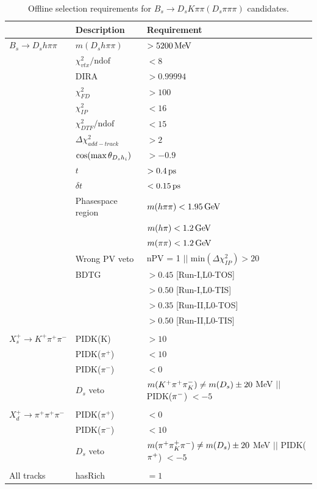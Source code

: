 \begin{table}[h]
\centering
\caption{Offline selection requirements for $B_s\to D_s K \pi\pi (D_s \pi\pi\pi)$ candidates.}
 \renewcommand{\arraystretch}{1.}
 \small
 \begin{tabular}{l l l}
\hline
\hline
 & Description & Requirement  \\
\hline
$B_s \to D_s h \pi \pi$  & $m(D_s h \pi \pi)$ & $> 5200 \mathrm{\,Me\kern -0.1em V}$ \\
&  $\chi^{2}_{vtx}/\text{ndof}  $&$ <  8$ \\
& DIRA &$ > 0.99994$ \\
& $\chi^{2}_{FD}$ & $> 100$ \\
& $\chi^{2}_{IP}$ & $< 16$ \\
&  $\chi^{2}_{DTF}/\text{ndof} $&$   <  15 $ \\
&  $\Delta\chi^{2}_{add-track} $&$   >  2 $ \\
& $\cos(\text{max} \, \theta_{{{D}_{s}} h_{i}})$ &$   > -0.9 $ \\
& $t$  & $ > 0.4 {\mathrm{ \,ps}}$ \\
& $\delta t$  & $ < 0.15 {\mathrm{ \,ps}}$ \\
& Phasespace region & $m(h\pi\pi) < 1.95 \mathrm{\,Ge\kern -0.1em V}$ \\ & & $m(h\pi) < 1.2 \mathrm{\,Ge\kern -0.1em V}$ \\ & & $m(\pi\pi) < 1.2 \mathrm{\,Ge\kern -0.1em V}$ \\
& Wrong PV veto & nPV = 1 $||$  $\text{min}(\Delta\chi^{2}_{IP}) > 20$ \\
& BDTG &  $> 0.45$ [Run-I,\textsf{L0-TOS}] \\
& & $> 0.50$ [Run-I,\textsf{L0-TIS}] \\
& & $> 0.35$ [Run-II,\textsf{L0-TOS}] \\
& & $> 0.50$ [Run-II,\textsf{L0-TIS}] \\
\\
$X_s^+ \to K^+ \pi^+ \pi^-$  & PIDK(K) & $> 10$ \\
& PIDK($\pi^+$) & $< 10$ \\
& PIDK($\pi^-$) & $< 0$ \\
& $D_s$ veto & $m({{K}^+} {{\pi}^+} \pi^-_K) \ne m(D_s) \pm 20$ MeV $||$ PIDK(${{\pi}^-}$) $< -5$ \\
\\
$X_d^+ \to \pi^+ \pi^+ \pi^-$  & PIDK($\pi^+$) & $< 0$ \\
& PIDK($\pi^-$) & $< 10$ \\
& $D_s$ veto & $m({{\pi}^+} \pi^+_K {{\pi}^-}) \ne m(D_s) \pm 20$ MeV $||$ PIDK(${{\pi}^+}$) $< -5$ \\
\\
All tracks & hasRich & $= 1$ \\

\hline
\hline
\end{tabular}
\label{table:selBs}
\end{table}






